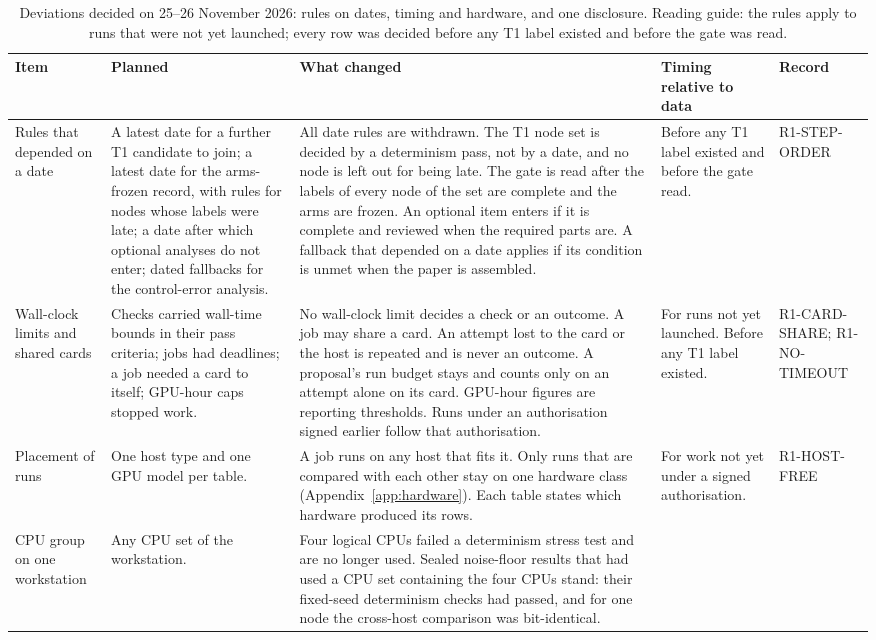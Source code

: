 \begin{table}[t]
\caption{Deviations decided on 25--26 November 2026: rules on dates, timing and hardware, and one disclosure. Reading guide: the rules apply to runs that were not yet launched; every row was decided before any T1 label existed and before the gate was read.}
\label{tab:dev-rules}
\footnotesize
\setlength{\tabcolsep}{3pt}
\begin{tabular}{L{0.8in}L{1.3in}L{1.9in}L{1.25in}L{0.98in}}
\toprule
Item & Planned & What changed & Timing relative to data & Record \\
\midrule
Rules that depended on a date &
A latest date for a further T1 candidate to join; a latest date for the arms-frozen record, with rules for nodes whose labels were late; a date after which optional analyses do not enter; dated fallbacks for the control-error analysis. &
All date rules are withdrawn. The T1 node set is decided by a determinism pass, not by a date, and no node is left out for being late. The gate is read after the labels of every node of the set are complete and the arms are frozen. An optional item enters if it is complete and reviewed when the required parts are. A fallback that depended on a date applies if its condition is unmet when the paper is assembled. &
Before any T1 label existed and before the gate read. &
R1-STEP-ORDER \\
\addlinespace
Wall-clock limits and shared cards &
Checks carried wall-time bounds in their pass criteria; jobs had deadlines; a job needed a card to itself; GPU-hour caps stopped work. &
No wall-clock limit decides a check or an outcome. A job may share a card. An attempt lost to the card or the host is repeated and is never an outcome. A proposal's run budget stays and counts only on an attempt alone on its card. GPU-hour figures are reporting thresholds. Runs under an authorisation signed earlier follow that authorisation. &
For runs not yet launched. Before any T1 label existed. &
R1-CARD-SHARE; R1-NO-TIMEOUT \\
\addlinespace
Placement of runs &
One host type and one GPU model per table. &
A job runs on any host that fits it. Only runs that are compared with each other stay on one hardware class (Appendix~\ref{app:hardware}). Each table states which hardware produced its rows. &
For work not yet under a signed authorisation. &
R1-HOST-FREE \\
\addlinespace
CPU group on one workstation &
Any CPU set of the workstation. &
Four logical CPUs failed a determinism stress test and are no longer used. Sealed noise-floor results that had used a CPU set containing the four CPUs stand: their fixed-seed determinism checks had passed, and for one node the cross-host comparison was bit-identical. &

\end{tabular}
\end{table}
